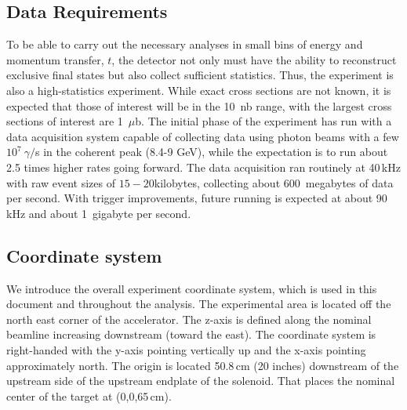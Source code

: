 \subsection{Data Requirements \label{sec:intro:data_requirements}}
To be able to carry out the necessary analyses in small bins of energy and momentum transfer, $t$, the detector not only must have the ability to reconstruct exclusive final states but also collect sufficient statistics. Thus, the \GX{} experiment is also a high-statistics experiment. While exact cross sections are not known, it is expected that those of interest will be in the 10~nb range, with the largest cross sections of interest are 1~$\mu$b. The initial phase of the \GX{} experiment has run with a data acquisition system capable of collecting data using photon beams with a few $10^{7}~\gamma/$s in the coherent peak (8.4-9 GeV), while the expectation is to run about 2.5 times higher rates going forward. The data acquisition ran routinely at 40\,kHz with raw event sizes of $15-20$kilobytes, collecting about 600~megabytes of data per second. With trigger improvements, future running is expected at about 90 kHz and about 1~gigabyte per second.  

\subsection{Coordinate system \label{sec:intro:coordinates}}
We introduce the overall experiment coordinate system, which is used in this document and throughout the analysis. The experimental area is located 
off the north east corner of the accelerator. The z-axis is defined along the nominal beamline increasing downstream (toward the east). The coordinate system 
is right-handed with the y-axis pointing vertically up and the x-axis pointing approximately north. 
The origin is located 50.8\,cm (20 inches) downstream of the upstream side of the upstream endplate of the solenoid. That places the nominal center of the target at (0,0,65\,cm).
